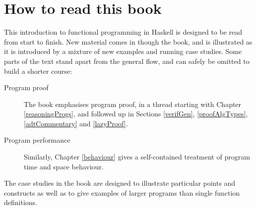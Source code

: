 \section*{How to read this book}

This introduction to functional programming in Haskell 
is designed to be read from start to finish. New material comes in though the book, and is illustrated as it is introduced by a mixture of new examples and running case studies. 
Some parts of the text stand apart from the general flow, and can safely be omitted to build a shorter course:
\begin{description}
\item[Program proof]
The book emphasises program proof, in a thread starting with Chapter \ref{reasoningProgs}, and followed up in Sections \ref{verifGen}, \ref{proofAlgTypes}, \ref{adtCommentary} and \ref{lazyProof}.
\item[Program performance] 
Similarly, Chapter \ref{behaviour} gives a self-contained
treatment of program time and space behaviour.
\end{description}
The case studies in the book are designed to illustrate particular points and constructs  as well as to give examples of larger programs than single function definitions.\label{CaseStudies}
